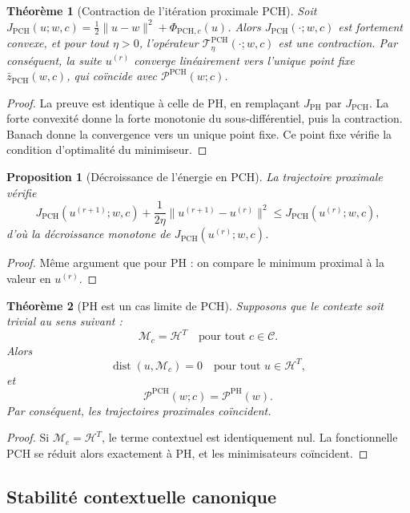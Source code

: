 \documentclass[11pt,a4paper]{article}
\newtheorem{proposition}{Proposition}[section]
\newtheorem{theorem}{Théorème}[section]
\DeclareMathOperator{\dist}{dist}
\newcommand{\C}{\mathcal C}
\newcommand{\Hh}{\mathcal H}
\newcommand{\Pcal}{\mathcal P}
\newcommand{\Mcal}{\mathcal M}
\newcommand{\1}{\mathbf 1}
\begin{document}
\begin{theorem}[Contraction de l'itération proximale PCH]
Soit \(J_{\mathrm{PCH}}(u;w,c)=\frac12\|u-w\|^2+\Phi_{\mathrm{PCH},c}(u)\).  
Alors \(J_{\mathrm{PCH}}(\cdot;w,c)\) est fortement convexe, et pour tout \(\eta>0\), l'opérateur \(\mathcal T^{\mathrm{PCH}}_{\eta}(\cdot;w,c)\) est une contraction.  
Par conséquent, la suite \(u^{(r)}\) converge linéairement vers l'unique point fixe \(\bar z_{\mathrm{PCH}}(w,c)\), qui coïncide avec \(\Pcal^{\mathrm{PCH}}(w;c)\).
\end{theorem}

\begin{proof}
La preuve est identique à celle de PH, en remplaçant \(J_{\mathrm{PH}}\) par \(J_{\mathrm{PCH}}\).  
La forte convexité donne la forte monotonie du sous-différentiel, puis la contraction.  
Banach donne la convergence vers un unique point fixe.  
Ce point fixe vérifie la condition d'optimalité du minimiseur.
\end{proof}

\begin{proposition}[Décroissance de l'énergie en PCH]
La trajectoire proximale vérifie
\[
J_{\mathrm{PCH}}(u^{(r+1)};w,c)
+
\frac{1}{2\eta}\|u^{(r+1)}-u^{(r)}\|^2
\le
J_{\mathrm{PCH}}(u^{(r)};w,c),
\]
d'où la décroissance monotone de \(J_{\mathrm{PCH}}(u^{(r)};w,c)\).
\end{proposition}

\begin{proof}
Même argument que pour PH : on compare le minimum proximal à la valeur en \(u^{(r)}\).
\end{proof}

\begin{theorem}[PH est un cas limite de PCH]
Supposons que le contexte soit trivial au sens suivant :
\[
\Mcal_c=\Hh^T
\quad\text{pour tout } c\in\C.
\]
Alors
\[
\dist(u,\Mcal_c)=0
\quad\text{pour tout } u\in\Hh^T,
\]
et
\[
\Pcal^{\mathrm{PCH}}(w;c)=\Pcal^{\mathrm{PH}}(w).
\]
Par conséquent, les trajectoires proximales coïncident.
\end{theorem}

\begin{proof}
Si \(\Mcal_c=\Hh^T\), le terme contextuel est identiquement nul.  
La fonctionnelle PCH se réduit alors exactement à PH, et les minimisateurs coïncident.
\end{proof}

\subsection{Stabilité contextuelle canonique}
\end{document}
